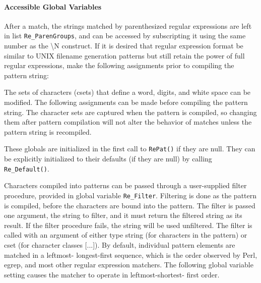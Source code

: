 \paragraph{Accessible Global Variables}
After a match, the strings matched by parenthesized regular expressions
are left in list \texttt{Re\_ParenGroups}, and can be accessed by
subscripting it using the same number as the {\textbackslash}N
construct. If it is desired that regular expression format be similar
to UNIX filename generation patterns but still retain the power of full
regular expressions, make the following assignments prior to compiling
the pattern string:


The sets of characters (csets) that define a word, digits, and white
space can be modified. The following assignments can be made before
compiling the pattern string. The character sets are captured when the
pattern is compiled, so changing them after pattern compilation will
not alter the behavior of matches unless the pattern string is
recompiled.


These globals are initialized in the first call to \texttt{RePat()} if
they are null. They can be explicitly initialized to their defaults (if
they are null) by calling \texttt{Re\_Default()}.

Characters compiled into patterns can be passed through a user-supplied
filter procedure, provided in global variable \texttt{Re\_Filter}.
Filtering is done as the pattern is compiled, before the characters are
bound into the pattern. The filter is passed one argument, the string
to filter, and it must return the filtered string as its result. If the
filter procedure fails, the string will be used unfiltered. The filter
is called with an argument of either type string (for characters in the
pattern) or cset (for character classes [...]). By default, individual
pattern elements are matched in a {\textquotedbl}leftmost-
longest-first{\textquotedbl} sequence, which is the order observed by
Perl, egrep, and most other regular expression
matchers. The following global variable setting causes the matcher to
operate in leftmost-shortest- first order.

